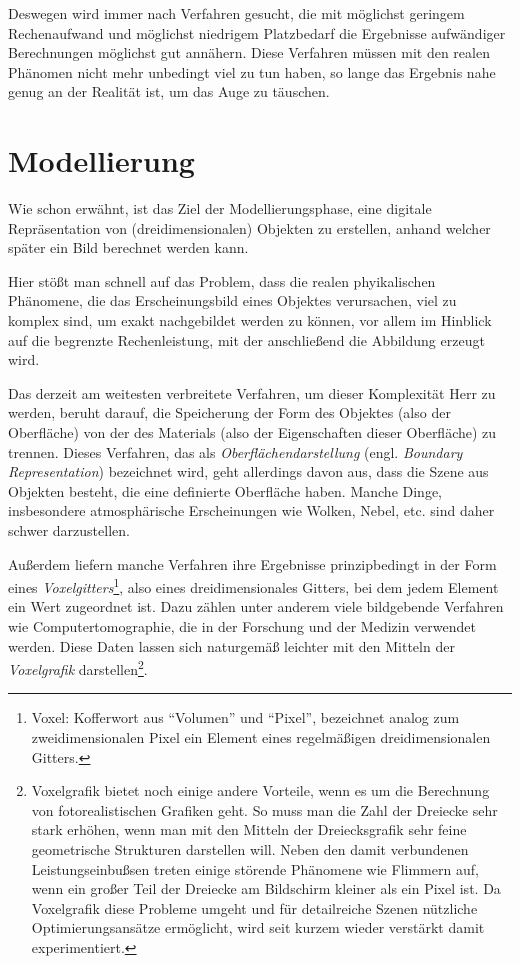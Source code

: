 Deswegen wird immer nach Verfahren gesucht, die mit möglichst geringem Rechenaufwand und möglichst niedrigem Platzbedarf die Ergebnisse aufwändiger Berechnungen möglichst gut annähern. Diese Verfahren müssen mit den realen Phänomen nicht mehr unbedingt viel zu tun haben, so lange das Ergebnis nahe genug an der Realität ist, um das Auge zu täuschen.

\section{Modellierung}
Wie schon erwähnt, ist das Ziel der Modellierungsphase, eine digitale Repräsentation von (dreidimensionalen) Objekten zu erstellen, anhand welcher später ein Bild berechnet werden kann.

Hier stößt man schnell auf das Problem, dass die realen phyikalischen Phänomene, die das Erscheinungsbild eines Objektes verursachen, viel zu komplex sind, um exakt nachgebildet werden zu können, vor allem im Hinblick auf die begrenzte Rechenleistung, mit der anschließend die Abbildung erzeugt wird.

Das derzeit am weitesten verbreitete Verfahren, um dieser Komplexität Herr zu werden, beruht darauf, die Speicherung der Form des Objektes (also der Oberfläche) von der des Materials (also der Eigenschaften dieser Oberfläche) zu trennen. Dieses Verfahren, das als \emph{Oberflächendarstellung} (engl. \emph{Boundary Representation}) bezeichnet wird, geht allerdings davon aus, dass die Szene aus Objekten besteht, die eine definierte Oberfläche haben. Manche Dinge, insbesondere atmosphärische Erscheinungen wie Wolken, Nebel, etc. sind daher schwer darzustellen.

Außerdem liefern manche Verfahren ihre Ergebnisse prinzipbedingt in der Form eines \emph{Voxelgitters}\footnote{Voxel: Kofferwort aus \enquote{Volumen} und \enquote{Pixel}, bezeichnet analog zum zweidimensionalen Pixel ein Element eines regelmäßigen dreidimensionalen Gitters.}, also eines dreidimensionales Gitters, bei dem jedem Element ein Wert zugeordnet ist. Dazu zählen unter anderem viele bildgebende Verfahren wie Computertomographie, die in der Forschung und der Medizin verwendet werden. Diese Daten lassen sich naturgemäß leichter mit den Mitteln der \emph{Voxelgrafik} darstellen\footnote{Voxelgrafik bietet noch einige andere Vorteile, wenn es um die Berechnung von fotorealistischen Grafiken geht. So muss man die Zahl der Dreiecke sehr stark erhöhen, wenn man mit den Mitteln der Dreiecksgrafik sehr feine geometrische Strukturen darstellen will. Neben den damit verbundenen Leistungseinbußsen treten einige störende Phänomene wie Flimmern auf, wenn ein großer Teil der Dreiecke am Bildschirm kleiner als ein Pixel ist. Da Voxelgrafik diese Probleme umgeht und für detailreiche Szenen nützliche Optimierungsansätze ermöglicht, wird seit kurzem wieder verstärkt damit experimentiert. }.

